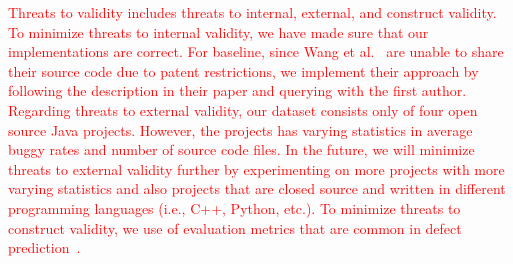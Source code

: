\textcolor{red}{Threats to validity includes threats to internal, external, and construct validity. To minimize threats to internal validity, we have made sure that our implementations are correct. For baseline, since Wang et al.~\cite{wang2016automatically} are unable to share their source code due to patent restrictions, we implement their approach by following the description in their paper and querying with the first author. Regarding threats to external validity, our dataset consists only of four open source Java projects. However, the projects has varying statistics in average buggy rates and number of source code files. In the future, we will minimize threats to external validity further by experimenting on more projects with more varying statistics and also projects that are closed source and written in different programming languages (i.e., C++, Python, etc.). To minimize threats to construct validity, we use of evaluation metrics that are common in defect prediction~\cite{menzies2007data, menzies2010defect, nam2013transfer}.
}

